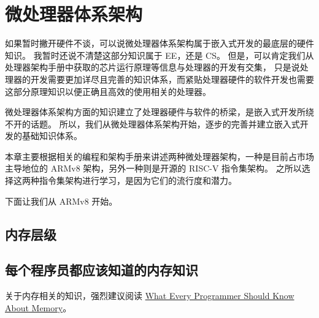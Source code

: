 \chapter{微处理器体系架构}

如果暂时撇开硬件不谈，可以说微处理器体系架构属于嵌入式开发的最底层的硬件知识。
我暂时还说不清楚这部分知识属于 EE，还是 CS。
但是，可以肯定我们从处理器架构手册中获取的芯片运行原理等信息与处理器的开发有交集，
只是说处理器的开发需要更加详尽且完善的知识体系，而紧贴处理器硬件的软件开发也需要这部分原理知识以便正确且高效的使用相关的处理器。

微处理器体系架构方面的知识建立了处理器硬件与软件的桥梁，是嵌入式开发所绕不开的话题。
所以，我们从微处理器体系架构开始，逐步的完善并建立嵌入式开发的基础知识体系。

本章主要根据相关的编程和架构手册来讲述两种微处理器架构，一种是目前占市场主导地位的 ARMv8 架构，另外一种则是开源的 RISC-V 指令集架构。
之所以选择这两种指令集架构进行学习，是因为它们的流行度和潜力。

下面让我们从 ARMv8 开始。





\section{内存层级}

\section{每个程序员都应该知道的内存知识}

关于内存相关的知识，强烈建议阅读
\href{https://people.freebsd.org/~lstewart/articles/cpumemory.pdf}{What Every Programmer Should Know About Memory}。


